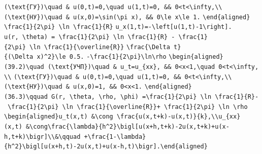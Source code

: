 \documentclass[
  ukrainian,
]{article}
\begin{document}
\texttt{(\textbackslash{}text\{ГУ\})\textbackslash{}quad\ \&\ u(0,t)=0,\textbackslash{}quad\ u(1,t)=0,\ \&\&\ 0\textless{}t\textless{}\textbackslash{}infty,\textbackslash{}\textbackslash{}}
\texttt{(\textbackslash{}text\{НУ\})\textbackslash{}quad\ \&\ u(x,0)=\textbackslash{}sin(\textbackslash{}pi\ x),\ \&\&\ 0\textbackslash{}le\ x\textbackslash{}le\ 1.}
\texttt{\textbackslash{}end\{aligned\}}
\texttt{\textbackslash{}frac\{1\}\{2\textbackslash{}pi\}\ \textbackslash{}ln\ \textbackslash{}frac\{1\}\{R\}}
\texttt{u\_x(1,t)=-\textbackslash{}left{[}u(1,t)-1\textbackslash{}right{]}.}
\texttt{u(r,\ \textbackslash{}theta)\ =\ \textbackslash{}frac\{1\}\{2\textbackslash{}pi\}\ \textbackslash{}ln\ \textbackslash{}frac\{1\}\{R\}\ -\ \textbackslash{}frac\{1\}\{2\textbackslash{}pi\}\ \textbackslash{}ln\ \textbackslash{}frac\{1\}\{\textbackslash{}overline\{R\}\}}
\texttt{\textbackslash{}frac\{\textbackslash{}Delta\ t\}\{(\textbackslash{}Delta\ x)\^{}2\}\textbackslash{}le\ 0.5.}
\texttt{-\textbackslash{}frac\{1\}\{2\textbackslash{}pi\}\textbackslash{}ln\textbackslash{}rho}
\texttt{\textbackslash{}begin\{aligned\}}
\texttt{(39.2)\textbackslash{}quad\ (\textbackslash{}text\{УЧП\})\textbackslash{}quad\ \&\ u\_t=u\_\{xx\},\ \&\&\ 0\textless{}x\textless{}1,\textbackslash{}quad\ 0\textless{}t\textless{}\textbackslash{}infty,\textbackslash{}\textbackslash{}}
\texttt{(\textbackslash{}text\{ГУ\})\textbackslash{}quad\ \&\ u(0,t)=0,\textbackslash{}quad\ u(1,t)=0,\ \&\&\ 0\textless{}t\textless{}\textbackslash{}infty,\textbackslash{}\textbackslash{}}
\texttt{(\textbackslash{}text\{НУ\})\textbackslash{}quad\ \&\ u(x,0)=1,\ \&\&\ 0\textless{}x\textless{}1.}
\texttt{\textbackslash{}end\{aligned\}}
\texttt{(36.3)\textbackslash{}qquad\ G(r,\ \textbackslash{}theta,\ \textbackslash{}rho,\ \textbackslash{}phi)\ =\textbackslash{}frac\{1\}\{2\textbackslash{}pi\}\ \textbackslash{}ln\ \textbackslash{}frac\{1\}\{R\}-\ \textbackslash{}frac\{1\}\{2\textbackslash{}pi\}\ \textbackslash{}ln\ \textbackslash{}frac\{1\}\{\textbackslash{}overline\{R\}\}+\ \textbackslash{}frac\{1\}\{2\textbackslash{}pi\}\ \textbackslash{}ln\ \textbackslash{}rho}
\texttt{\textbackslash{}begin\{aligned\}u\_t(x,t)\ \&\textbackslash{}cong\ \textbackslash{}frac\{u(x,t+k)-u(x,t)\}\{k\},\textbackslash{}\textbackslash{}u\_\{xx\}(x,t)\ \&\textbackslash{}cong\textbackslash{}frac\{\textbackslash{}lambda\}\{h\^{}2\}\textbackslash{}bigl{[}u(x+h,t+k)-2u(x,t+k)+u(x-h,t+k)\textbackslash{}bigr{]}\textbackslash{}\textbackslash{}\&\textbackslash{}qquad\ +\textbackslash{}frac\{1-\textbackslash{}lambda\}\{h\^{}2\}\textbackslash{}bigl{[}u(x+h,t)-2u(x,t)+u(x-h,t)\textbackslash{}bigr{]}.\textbackslash{}end\{aligned\}}
\end{document}
